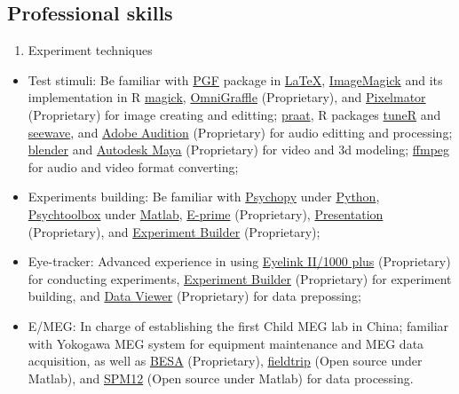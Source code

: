\documentclass[12pt,]{article}
\providecommand{\tightlist}{%
  \setlength{\itemsep}{0pt}\setlength{\parskip}{0pt}}
\begin{document}
\hypertarget{professional-skills}{%
\subsection{Professional skills}\label{professional-skills}}

\begin{enumerate}
\def\labelenumi{\arabic{enumi}.}
\tightlist
\item
  Experiment techniques
\end{enumerate}

\begin{itemize}
\tightlist
\item
  Test stimuli: Be familiar with
  \href{https://ctan.org/pkg/pgf?lang=en}{PGF} package in
  \href{https://www.latex-project.org}{LaTeX},
  \href{https://imagemagick.org}{ImageMagick} and its implementation in
  R
  \href{https://cran.r-project.org/web/packages/magick/index.html}{magick},
  \href{https://www.omnigroup.com/omnigraffle/}{OmniGraffle}
  (Proprietary), and \href{https://www.pixelmator.com}{Pixelmator}
  (Proprietary) for image creating and editting;
  \href{http://www.fon.hum.uva.nl/praat/}{praat}, R packages
  \href{https://cran.r-project.org/web/packages/tuneR/index.html}{tuneR}
  and \href{https://cran.r-project.org/package=seewave}{seewave}, and
  \href{https://www.adobe.com/products/audition.html}{Adobe Audition}
  (Proprietary) for audio editting and processing;
  \href{https://www.blender.org}{blender} and
  \href{https://www.autodesk.com/products/maya/overview}{Autodesk Maya}
  (Proprietary) for video and 3d modeling;
  \href{https://ffmpeg.org}{ffmpeg} for audio and video format
  converting;
\item
  Experiments building: Be familiar with
  \href{http://www.psychopy.org}{Psychopy} under
  \href{https://www.python.org}{Python},
  \href{http://psychtoolbox.org}{Psychtoolbox} under
  \href{https://www.mathworks.com/products/matlab.html}{Matlab},
  \href{https://www.pstnet.com/eprime.cfm}{E-prime} (Proprietary),
  \href{https://www.neurobs.com/presentation}{Presentation}
  (Proprietary), and
  \href{https://www.sr-research.com/experiment-builder/}{Experiment
  Builder} (Proprietary);
\item
  Eye-tracker: Advanced experience in using
  \href{https://www.sr-research.com}{Eyelink II/1000 plus} (Proprietary)
  for conducting experiments,
  \href{https://www.sr-research.com/experiment-builder/}{Experiment
  Builder} (Proprietary) for experiment building, and
  \href{https://www.sr-research.com/data-viewer/}{Data Viewer}
  (Proprietary) for data prepossing;
\item
  E/MEG: In charge of establishing the first Child MEG lab in China;
  familiar with Yokogawa MEG system for equipment maintenance and MEG
  data acquisition, as well as \href{http://www.besa.de}{BESA}
  (Proprietary), \href{http://www.fieldtriptoolbox.org}{fieldtrip} (Open
  source under Matlab), and
  \href{https://github.com/neurodebian/spm12}{SPM12} (Open source under
  Matlab) for data processing.
\end{itemize}
\end{document}

